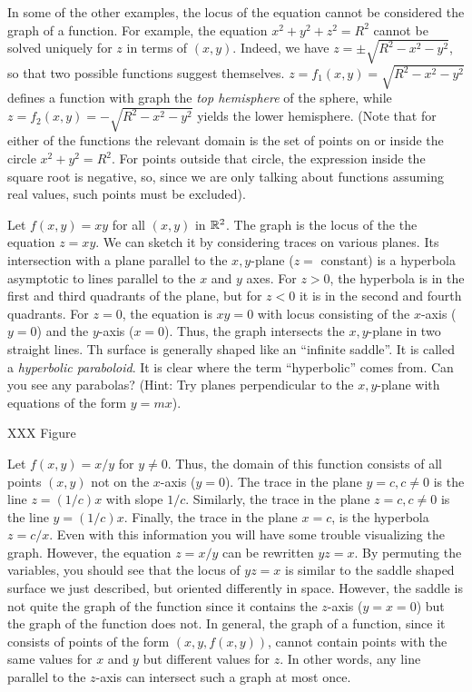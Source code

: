 In some of the other examples, the locus
of the equation cannot be considered the graph of a function.
For example, the equation $x^2 + y^2 + z^2 = R^2$ cannot be solved
uniquely for $z$ in terms of $(x,y)$.  Indeed, we have
$z = \pm\sqrt{R^2 - x^2 - y^2}$, so that two possible functions
suggest themselves.  $z = f_1(x,y) = \sqrt{R^2 - x^2 - y^2}$ 
defines a function with graph
the \emph{top hemisphere} of the sphere, while $z = f_2(x,y)
= - \sqrt{R^2 - x^2 - y^2}$ yields the lower hemisphere.  (Note that
for either of the functions the relevant domain is the set of
points on or inside the circle $x^2 + y^2 = R^2$.  For points outside
that circle, the expression inside the square root is negative, so,
since we are only talking about functions assuming real values,
such points must be excluded).

\begin{example}
	Let $f(x,y) = xy$ for all $(x,y)$ in $\mathbb{R}^2$.    The graph is the
	locus of the the equation $z = xy$.  We can sketch it by considering
	traces on various planes.  Its intersection with a plane parallel
	to the $x,y$-plane ($z =$ constant) is a hyperbola asymptotic to
	lines parallel to the $x$ and $y$ axes.   For $z > 0$, the hyperbola
	is in the first and third quadrants of the plane, but for
	$z < 0$ it is in the second and fourth quadrants.  For $z = 0$,
	the equation is $xy = 0$ with locus consisting of the $x$-axis
	($y = 0$) and the $y$-axis ($x = 0$).   Thus, the graph intersects
	the $x,y$-plane in two straight lines.  Th surface is generally
	shaped like an ``infinite saddle''.  It is called a {\it hyperbolic
	paraboloid}.  It is clear where the term ``hyperbolic'' comes from.
	Can you see any parabolas?  (Hint: Try planes perpendicular to
	the $x,y$-plane with equations of the form  $y = mx$).

	XXX Figure
\end{example}

\begin{example}
	 Let $f(x,y) = x/y$ for $y \not= 0$.  Thus, the domain of this
	function consists of all points $(x,y)$ not on the $x$-axis
	($y = 0$).
	The trace in the plane $y = c, c \not= 0$ is the line $z = (1/c)x$
	with slope $1/c$.   Similarly, the trace in the plane $z = c, c \not=0$
	is the line $y = (1/c)x$.  Finally, the trace in the plane $x = c$,
	is the hyperbola $z = c/x$.  Even with this information you will have
	some trouble visualizing the graph.   However, the equation
	$z = x/y$ can be rewritten $yz = x$.   By permuting the variables,
	you should see that the locus of $yz = x$
	 is similar to the  saddle shaped surface
	we just described, but oriented differently in space.  However,
	 the saddle
	is not quite the graph of the function since it  contains the 
	 $z$-axis ($y = x = 0$) but the graph of the function does not.
	In general, the graph of a function, since it consists of points
	of the form $(x,y,f(x,y))$, cannot contain points with the same
	values for $x$ and $y$ but different values for $z$.  In other words,
	any line parallel to the $z$-axis can intersect such a graph at most
	once. 
\end{example}

